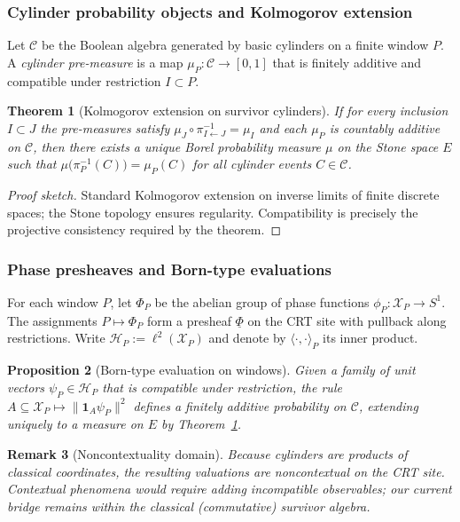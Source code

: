 \documentclass[12pt]{article}
\newtheorem{theorem}{Theorem}[section]
\newtheorem{proposition}[theorem]{Proposition}
\newtheorem{remark}[theorem]{Remark}
\numberwithin{equation}{section}
\begin{document}
\subsubsection{Cylinder probability objects and Kolmogorov extension}
Let $\mathcal{C}$ be the Boolean algebra generated by basic cylinders on a finite window $P$. A \emph{cylinder pre-measure} is a map $\mu_P: \mathcal{C}\to [0,1]$ that is finitely additive and compatible under restriction $I\subset P$.

\begin{theorem}[Kolmogorov extension on survivor cylinders]\label{thm:kolmogorov}
If for every inclusion $I\subset J$ the pre-measures satisfy $\mu_J\circ \pi_{I\leftarrow J}^{-1}=\mu_I$ and each $\mu_P$ is countably additive on $\mathcal{C}$, then there exists a unique Borel probability measure $\mu$ on the Stone space $E$ such that $\mu\big(\pi_P^{-1}(C)\big)=\mu_P(C)$ for all cylinder events $C\in\mathcal{C}$.
\end{theorem}

\begin{proof}[Proof sketch]
Standard Kolmogorov extension on inverse limits of finite discrete spaces; the Stone topology ensures regularity. Compatibility is precisely the projective consistency required by the theorem.
\end{proof}

\subsubsection{Phase presheaves and Born-type evaluations}
For each window $P$, let $\Phi_P$ be the abelian group of phase functions $\phi_P: \mathscr{X}_P\to S^1$. The assignments $P\mapsto \Phi_P$ form a presheaf $\underline{\Phi}$ on the CRT site with pullback along restrictions. Write $\mathcal{H}_P:=\ell^2(\mathscr{X}_P)$ and denote by $\langle \cdot,\cdot\rangle_P$ its inner product.

\begin{proposition}[Born-type evaluation on windows]\label{prop:born}
Given a family of unit vectors $\psi_P\in \mathcal{H}_P$ that is compatible under restriction, the rule $A\subseteq \mathscr{X}_P\mapsto \|\mathbf{1}_A\psi_P\|^2$ defines a finitely additive probability on $\mathcal{C}$, extending uniquely to a measure on $E$ by Theorem~\ref{thm:kolmogorov}.
\end{proposition}

\begin{remark}[Noncontextuality domain]
Because cylinders are products of classical coordinates, the resulting valuations are noncontextual on the CRT site. Contextual phenomena would require adding incompatible observables; our current bridge remains within the classical (commutative) survivor algebra.
\end{remark}
\end{document}
